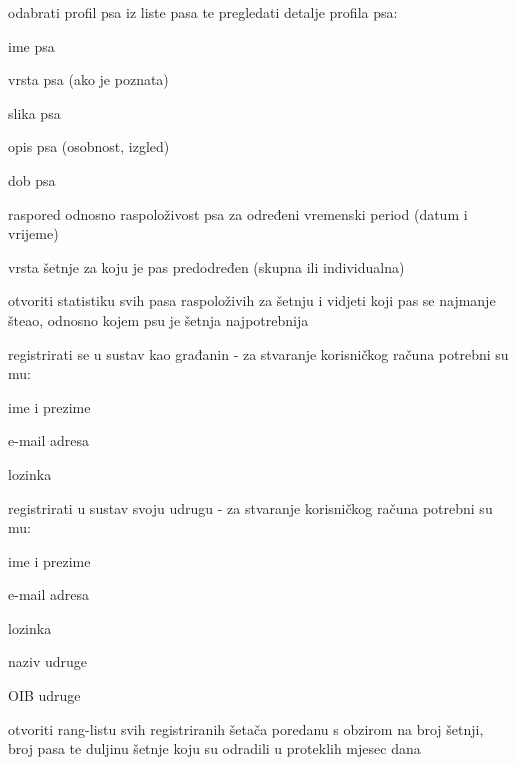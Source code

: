 \begin{packed_enum}
\begin{packed_enum}
					\item odabrati profil psa iz liste pasa te pregledati detalje profila psa: 
					\begin{packed_enum}
						\item ime psa
						\item vrsta psa (ako je poznata)
						\item slika psa
						\item opis psa (osobnost, izgled)
						\item dob psa
						\item raspored odnosno raspoloživost psa za određeni vremenski period (datum i vrijeme) 
						\item vrsta šetnje za koju je pas predodređen (skupna ili individualna)
					\end{packed_enum} 
					\item otvoriti statistiku svih pasa raspoloživih za šetnju i vidjeti koji pas se najmanje šteao, odnosno kojem psu je šetnja najpotrebnija
					\item registrirati se u sustav kao građanin - za stvaranje korisničkog računa potrebni su mu:
					\begin{packed_enum}
						\item ime i prezime
						\item e-mail adresa
						\item lozinka 
					\end{packed_enum}
					\item registrirati u sustav svoju udrugu - za stvaranje korisničkog računa potrebni su mu:
					\begin{packed_enum}
						\item ime i prezime
						\item e-mail adresa
						\item lozinka 
						\item naziv udruge
						\item OIB udruge
					\end{packed_enum}
					\item  otvoriti rang-listu svih registriranih šetača poredanu s obzirom na broj šetnji, broj pasa te duljinu šetnje koju su odradili u proteklih mjesec dana
					
				\end{packed_enum}
				\vspace{5mm}
			

\end{packed_enum}
